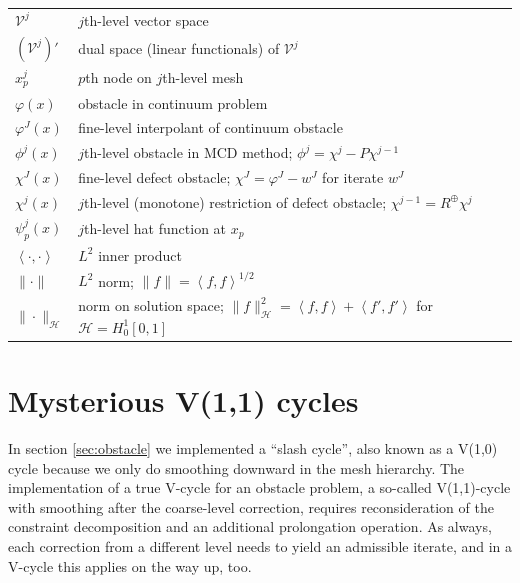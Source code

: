 \documentclass[letterpaper,final,12pt,reqno]{amsart}
\theoremstyle{claim}
\newcommand{\ip}[2]{\left<#1,#2\right>}
\newcommand{\mR}{R^{\bm{\oplus}}}
\numberwithin{equation}{section}
\numberwithin{figure}{section}
\numberwithin{table}{section}
\numberwithin{theorem}{section}
\begin{document}
\begin{longtable}{l|l}
$\mathcal{V}^j$ & $j$th-level vector space \\
$(\mathcal{V}^j)'$ & dual space (linear functionals) of $\mathcal{V}^j$  \\
$x_p^j$ & $p$th node on $j$th-level mesh \\
$\varphi(x)$ & obstacle in continuum problem \\
$\varphi^J(x)$ & fine-level interpolant of continuum obstacle \\
$\phi^j(x)$ & $j$th-level obstacle in MCD method; $\phi^j=\chi^j - P\chi^{j-1}$ \\
$\chi^J(x)$ & fine-level defect obstacle; $\chi^J = \varphi^J - w^J$ for iterate $w^J$ \\
$\chi^j(x)$ & $j$th-level (monotone) restriction of defect obstacle; $\chi^{j-1} = \mR \chi^j$ \\
$\psi_p^j(x)$ & $j$th-level hat function at $x_p$ \\
$\ip{\cdot}{\cdot}$ & $L^2$ inner product \\
$\|\cdot\|$ & $L^2$ norm; $\|f\|=\ip{f}{f}^{1/2}$ \\
$\|\cdot\|_{\mathcal{H}}$ & norm on solution space; $\|f\|_{\mathcal{H}}^2 =\ip{f}{f} + \ip{f'}{f'}$ for $\mathcal{H}=H_0^1[0,1]$
\end{longtable}


\section{Mysterious V(1,1) cycles}  In section \ref{sec:obstacle} we implemented a ``slash cycle'', also known as a V(1,0) cycle because we only do smoothing downward in the mesh hierarchy.  The implementation of a true V-cycle for an obstacle problem, a so-called V(1,1)-cycle \cite{GraeserKornhuber2009} with smoothing after the coarse-level correction, requires reconsideration of the constraint decomposition and an additional prolongation operation.  As always, each correction from a different level needs to yield an admissible iterate, and in a V-cycle this applies on the way up, too.
\end{document}
